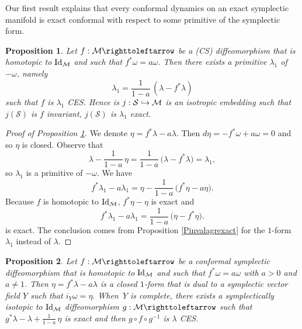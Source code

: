 \documentclass[10pt]{amsart}
\def\hto{\mathrel{\lhook\joinrel\to}}
\newtheorem{proposition}{Proposition}
\theoremstyle{definition}
\def\cM{{\mathcal M}}
\def\cS{{\mathcal S}}
\begin{document}
Our first result explains that every conformal dynamics on an exact symplectic manifold is exact conformal with respect to some primitive of the symplectic form.

\begin{proposition}\label{PLiouvillembedding}
Let $f: \cM \righttoleftarrow$ be a (CS) diffeomorphism that is homotopic to ${\rm Id}_{\cM}$ and such that $f^*\omega=a\omega$. Then there exists a primitive $\lambda_1$ of $-\omega$, namely\vspace*{-3pt}
\[
\lambda_1=\frac{1}{1-a}\,(\lambda-f^*\lambda)
\]
such that $f$ is $\lambda_1$ CES. Hence is $j:\cS\hto\cM$ is an isotropic embedding such that $j(\cS)$ is $f$ invariant, $j(\cS)$ is $\lambda_1$ exact.
\end{proposition}

\begin{proof}[Proof of Proposition \ref{PLiouvillembedding}]
We denote $\eta=f^*\lambda-a\lambda$. Then $d\eta=-f^*\omega+a\omega=0$ and so $\eta$ is closed. Observe that\vspace*{-3pt}
\[
\lambda-\frac{1}{1-a}\,\eta=\frac{1}{1-a}\,\big(\lambda-f^*\lambda)=\lambda_1,
\]
so $\lambda_1$ is a primitive of $-\omega$. We have\vspace*{-3pt}
\[
f^*\lambda_1-a\lambda_1=\eta-\frac{1}{1-a}\,\big(f^*\eta-a\eta\big).
\]
Because $f$ is homotopic to ${\rm Id}_\cM$, $f^*\eta-\eta$ is exact and\vspace*{-3pt}
\[
f^*\lambda_1-a\lambda_1=\frac{1}{1-a}\,\big( \eta-f^*\eta\big).
\]
is exact. The conclusion comes from Proposition \ref{Pinvalagrexact} for the $1$-form $\lambda_1$ instead of $\lambda$.
\end{proof}

\begin{proposition}\label{PCES}
Let $f: \cM \righttoleftarrow$ be a conformal symplectic diffeomorphism that is homotopic to ${\rm Id}_\cM$ and such that $f^*\omega=a\omega$ with $a>0$ and $a\not=1$. Then $\eta=f^*\lambda-a\lambda$ is a closed $1$-form that is dual to a symplectic vector field $Y$ such that $i_Y\omega=\eta.$ When~$Y$ is complete, there exists a symplectically isotopic to ${\rm Id}_\cM$ diffeomorphism $g: \cM \righttoleftarrow$ such that $g^*\lambda-\lambda +\frac{1}{1-a}\,\eta$ is exact and then $g\circ f\circ g^{-1}$ is $\lambda$ CES.
\end{proposition}
\end{document}
